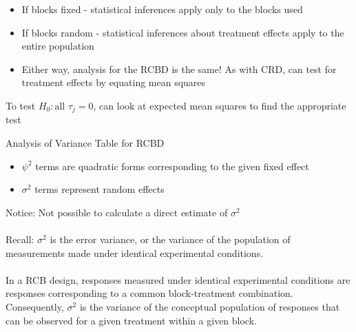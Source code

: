 \newpage

\begin{itemize}
        \item{If blocks fixed - statistical inferences apply only to the blocks used}
        \item{If blocks random - statistical inferences about treatment effects apply to the entire population}
        \item{Either way, analysis for the RCBD is the same!  As with CRD, can test for treatment effects by equating mean squares}\\
\end{itemize}
To test $H_{0}: \text{all } \tau_{j}=0$, can look at expected mean squares to find the appropriate test
	
\begin{center}Analysis of Variance Table for RCBD\end{center}
    \begin{itemize}
    	\item{$\psi^2$ terms are quadratic forms corresponding to the given fixed effect}
    	\item{$\sigma^2$ terms represent random effects}
    \end{itemize}
		
Notice:  Not possible to calculate a direct estimate of $\sigma^2$\\~\\
Recall: $\sigma^2$ is the error variance, or the variance of the population of measurements made under identical experimental conditions.\\~\\

In a RCB design, responses measured under identical experimental conditions are responses corresponding to a common block-treatment combination.  Consequently, $\sigma^2$ is the variance of the conceptual population of responses that can be observed for a given treatment within a given block.\\~\\

